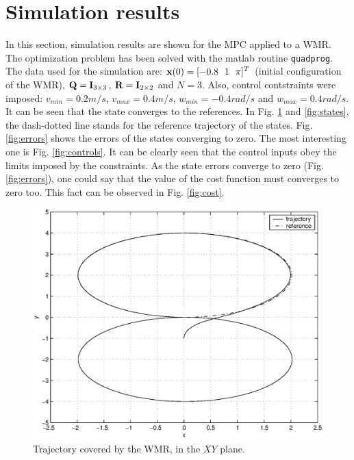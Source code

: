 \documentclass[twocolumn]{IEEEtran} %
\begin{document}
\section{Simulation results}\label{sec:simulations}
In this section, simulation results are shown for the MPC applied to a WMR. The optimization problem has been solved with the {\sc matlab} routine {\tt quadprog}. The data used for the simulation are: ${\bf x}(0)=[-0.8~~1~~\pi]^T$ (initial configuration of the WMR), ${\bf Q}={\bf I}_{3\times 3}$, ${\bf R}={\bf I}_{2\times 2}$ and $N=3$. Also, control contstraints were imposed: $v_{min}=0.2 m/s$, $v_{max}=0.4 m/s$, $w_{min}=-0.4 rad/s$ and $w_{max}=0.4 rad/s$. It can be seen that the state converges to the references. In Fig. \ref{fig:traj8} and \ref{fig:states}, the dash-dotted line stands for the reference trajectory of the states. Fig. \ref{fig:errors} shows the errors of the states converging to zero. The most interesting one is Fig. \ref{fig:controls}. It can be clearly seen that the control inputs obey the limits imposed by the constraints. As the state errors converge to zero (Fig. \ref{fig:errors}), one could say that the value of the cost function must converges to zero too. This fact can be observed in Fig. \ref{fig:cost}.
\begin{figure}\begin{center}
    \includegraphics[width=\linewidth]{Figures/traj8.eps}
    \caption{Trajectory covered by the WMR, in the $XY$ plane.}
    \label{fig:traj8}
\end{center}\end{figure}
\end{document}
